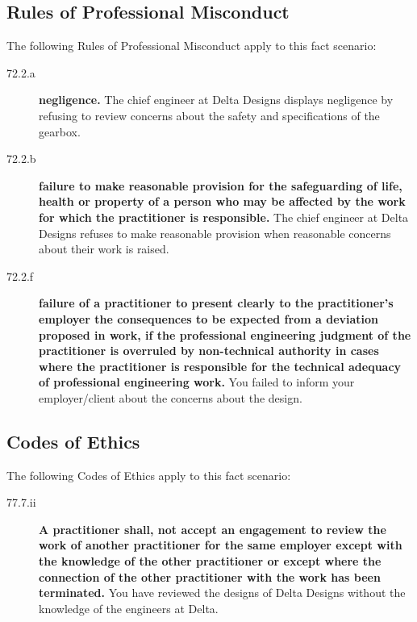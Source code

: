 \documentclass[12pt,letterpaper]{article}
\begin{document}
\subsection*{Rules of Professional Misconduct}
The following Rules of Professional Misconduct apply to this fact scenario:
\begin{description}
	\item[72.2.a] \textbf{negligence.} The chief engineer at Delta Designs displays negligence by refusing to review concerns about the safety and specifications of the gearbox.
	\item[72.2.b] \textbf{failure to make reasonable provision for the safeguarding of life, health or property of a person who may be affected by the work for which the practitioner is responsible.} The chief engineer at Delta Designs refuses to make reasonable provision when reasonable concerns about their work is raised.
	\item[72.2.f] \textbf{failure of a practitioner to present clearly to the practitioner's employer the consequences to be expected from a deviation proposed in work, if the professional engineering judgment of the practitioner is overruled by non-technical authority in cases where the practitioner is responsible for the technical adequacy of professional engineering work.} You failed to inform your employer/client about the concerns about the design.
\end{description}

\subsection*{Codes of Ethics}
The following Codes of Ethics apply to this fact scenario:
\begin{description}
	\item[77.7.ii] \textbf{A practitioner shall, not accept an engagement to review the work of another practitioner for the same employer except with the knowledge of the other practitioner or except where the connection of the other practitioner with the work has been terminated.} You have reviewed the designs of Delta Designs without the knowledge of the engineers at Delta.
\end{description}
\end{document}
